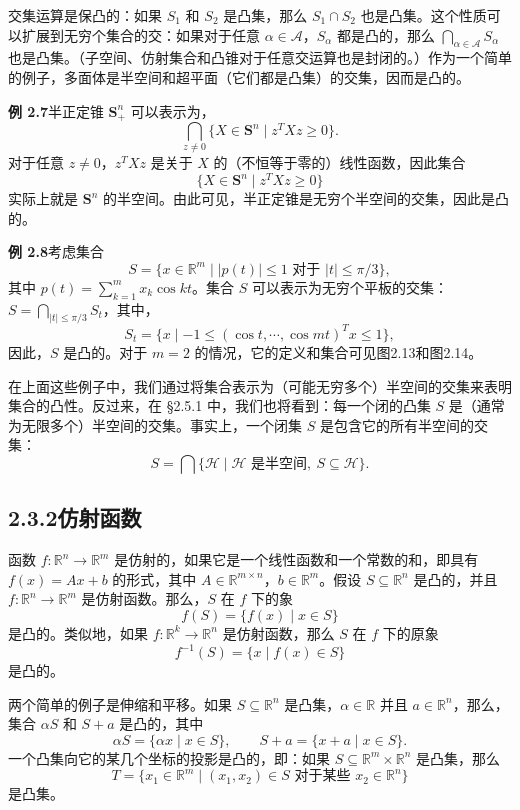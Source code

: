 \documentclass[UTF8,12pt,a4paper,fontset=fandol]{ctexart}
\begin{document}
交集运算是保凸的：如果 $S_1$ 和 $S_2$ 是凸集，那么 $S_1\cap S_2$ 也是凸集。这个性质可以扩展到无穷个集合的交：如果对于任意 $\alpha\in\mathcal{A}$，$S_\alpha$ 都是凸的，那么 $\bigcap_{\alpha\in\mathcal{A}}S_\alpha$ 也是凸集。（子空间、仿射集合和凸锥对于任意交运算也是封闭的。）作为一个简单的例子，多面体是半空间和超平面（它们都是凸集）的交集，因而是凸的。

\noindent\textbf{例 2.7}\quad 半正定锥 $\mathbf{S}_+^n$ 可以表示为，
\[
  \bigcap_{z\ne 0}\{X\in\mathbf{S}^n\mid z^TXz\ge 0\}.
\]
对于任意 $z\ne 0$，$z^TXz$ 是关于 $X$ 的（不恒等于零的）线性函数，因此集合
\[
  \{X\in\mathbf{S}^n\mid z^TXz\ge 0\}
\]
实际上就是 $\mathbf{S}^n$ 的半空间。由此可见，半正定锥是无穷个半空间的交集，因此是凸的。

\noindent\textbf{例 2.8}\quad 考虑集合
\begin{equation}
  S=\{x\in\mathbb{R}^m\mid |p(t)|\le 1\text{ 对于 }|t|\le \pi/3\},
  \tag{2.10}
\end{equation}
其中 $p(t)=\sum_{k=1}^m x_k\cos kt$。集合 $S$ 可以表示为无穷个平板的交集：$S=\bigcap_{|t|\le\pi/3}S_t$，其中，
\[
  S_t=\{x\mid -1\le (\cos t,\cdots,\cos mt)^Tx\le 1\},
\]
因此，$S$ 是凸的。对于 $m=2$ 的情况，它的定义和集合可见图2.13和图2.14。

在上面这些例子中，我们通过将集合表示为（可能无穷多个）半空间的交集来表明集合的凸性。反过来，在 §2.5.1 中，我们也将看到：每一个闭的凸集 $S$ 是（通常为无限多个）半空间的交集。事实上，一个闭集 $S$ 是包含它的所有半空间的交集：
\[
  S=\bigcap\{\mathcal{H}\mid \mathcal{H}\text{ 是半空间},\ S\subseteq\mathcal{H}\}.
\]

\subsection*{2.3.2\quad 仿射函数}

函数 $f:\mathbb{R}^n\to\mathbb{R}^m$ 是仿射的，如果它是一个线性函数和一个常数的和，即具有 $f(x)=Ax+b$ 的形式，其中 $A\in\mathbb{R}^{m\times n}$，$b\in\mathbb{R}^m$。假设 $S\subseteq\mathbb{R}^n$ 是凸的，并且 $f:\mathbb{R}^n\to\mathbb{R}^m$ 是仿射函数。那么，$S$ 在 $f$ 下的象
\[
  f(S)=\{f(x)\mid x\in S\}
\]
是凸的。类似地，如果 $f:\mathbb{R}^k\to\mathbb{R}^n$ 是仿射函数，那么 $S$ 在 $f$ 下的原象
\[
  f^{-1}(S)=\{x\mid f(x)\in S\}
\]
是凸的。

两个简单的例子是伸缩和平移。如果 $S\subseteq\mathbb{R}^n$ 是凸集，$\alpha\in\mathbb{R}$ 并且 $a\in\mathbb{R}^n$，那么，集合 $\alpha S$ 和 $S+a$ 是凸的，其中
\[
  \alpha S=\{\alpha x\mid x\in S\},\qquad S+a=\{x+a\mid x\in S\}.
\]
一个凸集向它的某几个坐标的投影是凸的，即：如果 $S\subseteq\mathbb{R}^m\times\mathbb{R}^n$ 是凸集，那么
\[
  T=\{x_1\in\mathbb{R}^m\mid (x_1,x_2)\in S\text{ 对于某些 }x_2\in\mathbb{R}^n\}
\]
是凸集。
\end{document}
